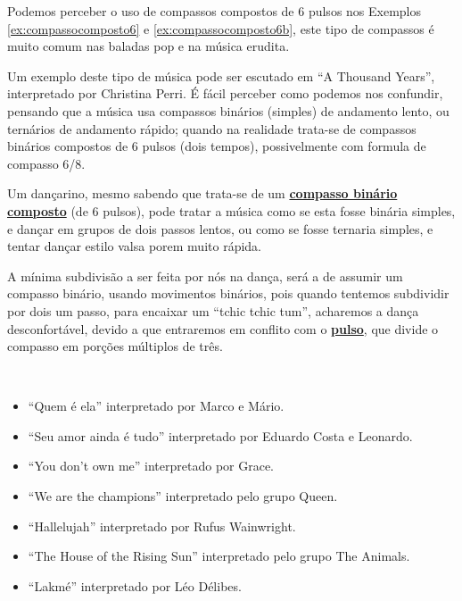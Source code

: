 Podemos perceber o uso de compassos compostos de 6 pulsos nos Exemplos \ref{ex:compassocomposto6}
e \ref{ex:compassocomposto6b},
este tipo de compassos é muito comum nas baladas pop e na música erudita.
\begin{example}
\label{ex:compassocomposto6}
Um exemplo deste tipo de música pode ser escutado em ``A Thousand Years'', 
interpretado por Christina Perri. É fácil perceber como podemos nos confundir,
pensando que a música usa compassos binários (simples) de andamento lento,
ou ternários de andamento rápido; quando na realidade trata-se de compassos binários compostos de 6 pulsos (dois tempos),
possivelmente com formula de compasso 6/8.

Um dançarino, mesmo sabendo que trata-se de um \hyperref[compasso:binario]{\textbf{compasso binário composto}} (de 6 pulsos),
pode tratar a música como se esta fosse binária simples, e dançar em grupos de dois passos lentos,
ou como se fosse ternaria simples, e tentar dançar estilo valsa porem muito rápida.

A mínima subdivisão a ser feita por nós na dança, 
será a de assumir um compasso binário, usando movimentos binários,
pois quando tentemos subdividir por dois um passo, para encaixar um ``tchic tchic tum'',
acharemos a dança desconfortável, devido a que
entraremos em conflito com o \hyperref[ref:Pulso]{\textbf{pulso}}, 
que divide o compasso em porções múltiplos de três.
  
\end{example}

\begin{example}
\label{ex:compassocomposto6b}
~
\begin{itemize}
\item ``Quem é ela'' interpretado por Marco e Mário.
\item ``Seu amor ainda é tudo'' interpretado por Eduardo Costa e Leonardo.
\item ``You don't own me'' interpretado por Grace.
\item ``We are the champions'' interpretado pelo grupo Queen.
\item ``Hallelujah'' interpretado por Rufus Wainwright.
\item ``The House of the Rising Sun'' interpretado pelo grupo  The Animals.
\item ``Lakmé'' interpretado por Léo Délibes.
\end{itemize}
\end{example}

